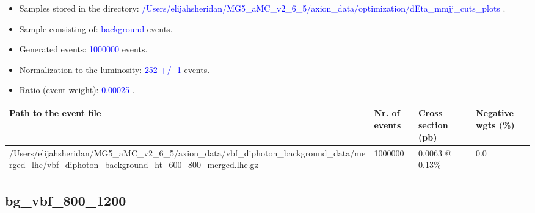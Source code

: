 \documentclass[a4paper, 10pt]{article}
\begin{document}
\begin{itemize}
  \item Samples stored in the directory: \textcolor{blue}{/\-Users/\-elijahsheridan/\-MG5\_aMC\_v2\_6\_5/\-axion\_data/\-optimization/\-dEta\_mmjj\_cuts\_plots} .
   \item Sample consisting of: \textcolor{blue}{background}  events.
   \item Generated events: \textcolor{blue}{1000000 }  events.
   \item Normalization to the luminosity: \textcolor{blue}{252}\textcolor{blue}{ +/\-- }\textcolor{blue}{1 }  events.
   \item Ratio (event weight): \textcolor{blue}{0.00025 } .  
 
\end{itemize}
\begin{table}[H]
  \begin{center}
    \begin{tabular}{|m{55.0mm}|m{25.0mm}|m{30.0mm}|m{30.0mm}|}
      \hline
      {\cellcolor{yellow}         Path to the event file}& {\cellcolor{yellow}         Nr. of events}& {\cellcolor{yellow}         Cross section (pb)}& {\cellcolor{yellow}         Negative wgts (\%)}\\
      \hline
      {\cellcolor{white}          /\-Users/\-elijahsheridan/\-MG5\_aMC\_v2\_6\_5/\-axion\_data/\-vbf\_diphoton\_background\_data/\-merged\_lhe/\-vbf\_diphoton\_background\_ht\_600\_800\_merged.lhe.gz}& {\cellcolor{white}          1000000}& {\cellcolor{white}          0.0063 @ 0.13\%}& {\cellcolor{white}          0.0}\\
\hline
    \end{tabular}
  \end{center}
\end{table}

\subsection{ bg\_vbf\_800\_1200}
\end{document}
